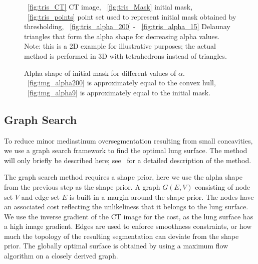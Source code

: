 \documentclass{llncs}
\begin{document}
\begin{figure}[ht!]
{  \label{fig:tris_alpha_50}
  }
  \caption{~\ref{fig:tris_CT} CT image, ~\ref{fig:tris_Mask} initial mask, ~\ref{fig:tris_points} point set used to represent initial mask obtained by thresholding, ~\ref{fig:tris_alpha_200} - ~\ref{fig:tris_alpha_15} Delaunay triangles that form the alpha shape for decreasing alpha values. Note: this is a 2D example for illustrative purposes; the actual method is performed in 3D with tetrahedrons instead of triangles. }
  \label{fig:tris}
\end{figure}


\begin{figure}[t]
  \centering
  \caption{Alpha shape of initial mask for different values of $\alpha$. ~\ref{fig:img_alpha200} is approximately equal to the convex hull, ~\ref{fig:img_alpha9} is approximately equal to the initial mask.}
  \label{fig:alphashapes}
\end{figure}
%
\subsection{Graph Search}
%
To reduce minor mediastinum oversegmentation resulting from small concavities, we use a graph search framework to find the optimal lung surface. The method will only briefly be described here; see~\cite{li2006} for a detailed description of the method. 

The graph search method requires a shape prior, here we use the alpha shape from the previous step as the shape prior. A graph $G(E,V)$ consisting of node set $V$ and edge set $E$ is built in a margin around the shape prior. The nodes have an associated cost reflecting the unlikeliness that it belongs to the lung surface. We use the inverse gradient of the CT image for the cost, as the lung surface has a high image gradient. Edges are used to enforce smoothness constraints, or how much the topology of the resulting segmentation can deviate from the shape prior. The globally optimal surface is obtained by using a maximum flow algorithm on a closely derived graph. 
\end{document}
